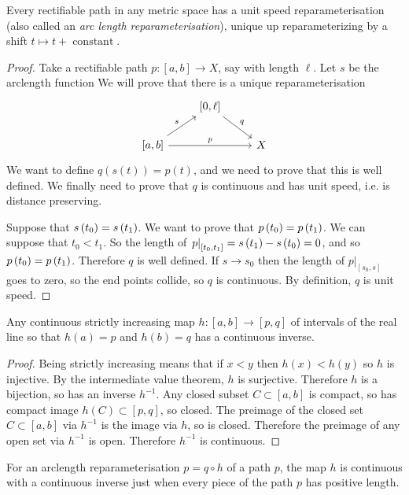 \begin{theorem}\label{theorem:arclength.reparameterisation}
Every rectifiable path in any metric space has a unit speed reparameterisation (also called an \emph{arc length reparameterisation}), unique up reparameterizing by a shift \(t \mapsto t+\operatorname{constant}\).
\end{theorem}
\begin{proof}
Take a rectifiable path \(p \colon [a,b] \to X\), say with length \(\ell\).
Let \(s\) be the arclength function 
We will prove that there is a unique reparameterisation
\[
\begin{tikzcd}
{} & {\left[0,\ell\right]} \arrow{dr}{q} & \\
{\left[a,b\right]} \arrow{rr}{p} \arrow{ur}{s} & {} & X
\end{tikzcd}
\]
We want to define \(q(s(t))=p(t)\), and we need to prove that this is well defined.
We finally need to prove that \(q\) is continuous and has unit speed, i.e. is distance preserving.

Suppose that \(s\left(t_0\right)=s\left(t_1\right)\).
We want to prove that \(p\left(t_0\right)=p\left(t_1\right)\).
We can suppose that \(t_0 < t_1\).
So the length of \(\left.p\right|_{\left[t_0,t_1\right]}=s\left(t_1\right)-s\left(t_0\right)=0\), and so \(p\left(t_0\right)=p\left(t_1\right)\).
Therefore \(q\) is well defined.
If \(s \to s_0\) then the length of \(\left.p\right|_{\left[s_0,s\right]}\) goes to zero, so the end points collide, so \(q\) is continuous.
By definition, \(q\) is unit speed.
\end{proof}
\begin{lemma}\label{lemma:increase}
Any continuous strictly increasing map \(h \colon [a,b] \to [p,q]\) of intervals of the real line so that \(h(a)=p\) and \(h(b)=q\) has a continuous inverse.
\end{lemma}
\begin{proof}
Being strictly increasing means that if \(x < y\) then \(h(x) < h(y)\) so \(h\) is injective.
By the intermediate value theorem, \(h\) is surjective.
Therefore \(h\) is a bijection, so has an inverse \(h^{-1}\).
Any closed subset \(C \subset [a,b]\) is compact, so has compact image \(h(C) \subset [p,q]\), so closed.
The preimage of the closed set \(C \subset [a,b]\) via \(h^{-1}\) is the image via \(h\), so is closed.
Therefore the preimage of any open set via \(h^{-1}\) is open.
Therefore \(h^{-1}\) is continuous.
\end{proof}
\begin{lemma}
For an arclength reparameterisation \(p=q \circ h\) of a path \(p\), the map \(h\) is continuous with a continuous inverse just when every piece of the path \(p\) has positive length.
\end{lemma}
